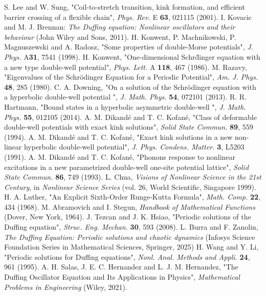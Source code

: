 \documentclass[%
 aip,
cha,
 amsmath,amssymb,
preprint,
]{revtex4-2}
\begin{document}
\begin{thebibliography}{}
S. Lee and W. Sung, "Coil-to-stretch transition, kink formation, and efficient barrier crossing of a flexible chain", {\it Phys. Rev.} E {\bf 63}, 021115 (2001).
 I. Kovacic and M. J. Brennan: {\it The Duffing equation: Nonlinear oscillators and their behaviour} (John Wiley and Sons, 2011).
H. Konwent, P. Machnikowski, P. Magnuszewski and A. Radosz, "Some properties of double-Morse potentials", {\it J. Phys.} A{\bf 31}, 7541 (1998).
H. Konwent, "One-dimensional Schr\"dinger equation with a new type double-well potential", {\it Phys. Lett.} A {\bf 118}, 467 (1986).
M. Razavy, "Eigenvalues of the Schr\"odinger Equation for a Periodic Potential", {\it Am. J. Phys.} {\bf 48}, 285 (1980).
C. A. Downing, "On a solution of the Schr\"odinger equation with a hyperbolic double-well potential ", {\it J. Math. Phys.} {\bf 54}, 072101 (2013).
R. R. Hartmann, "Bound states in a hyperbolic asymmetric double-well ", {\it J. Math. Phys.} {\bf 55}, 012105 (2014).
A. M. Dikand\'e and T. C. Kofan\'e, "Class of deformable double-well potentials with exact kink solutions", {\it Solid State Commun.} {\bf 89}, 559 (1994).
A. M. Dikand\'e and T. C. Kofan\'e, "Exact kink solutions in a new non-linear hyperbolic double-well potential", {\it J. Phys. Condens. Matter.} {\bf 3}, L5203 (1991).
A. M. Dikand\'e and T. C. Kofan\'e, "Phonons response to nonlinear excitations in a new parametrized double-well one-site potential lattice", {\it Solid State Commun.} {\bf 86}, 749 (1993).
 L. Chua, {\it Visions of Nonlinear Science in the 21st Century}, in {\it Nonlinear
Science Series} (vol. 26, World Scientific, Singapore 1999).
H. A. Luther, "An Explicit Sixth-Order Runge-Kutta Formula", {\it Math. Comp.} {\bf 22}, 434 (1968).
M. Abramovich and I. Stegun, {\it Handbook of Mathematical Functions} (Dover, New York, 1964).
J. Tezcan and J. K. Hsiao, "Periodic solutions of the Duffing equation", {\it Struc. Eng. Mechan.} {\bf 30}, 593 (2008).
L. Burra and F. Zanolin, {\it The Duffing Equation: Periodic solutions and chaotic dynamics} (Infosys Science Foundation Series in Mathematical Sciences, Springer, 2025)
H. Wang and Y. Li, "Periodic solutions for Duffing equations", {\it Nonl. Anal. Methods and Appli.} {\bf 24}, 961 (1995).
A. H. Salas, J. E. C. Hernandez and L. J. M. Hernandez, "The Duffing Oscillator Equation and Its Applications in Physics", {\it Mathematical Problems in Engineering} (Wiley, 2021).

\end{thebibliography}
\end{document}
